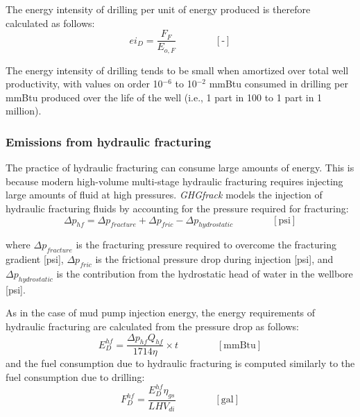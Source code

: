 \documentclass[11pt]{report}
\newcommand{\eqnunit}[1]{\quad\quad \scriptstyle{\left[\text{#1}\right]}}
\begin{document}
The energy intensity of drilling per unit of energy produced is therefore calculated as follows:
\begin{equation}
ei_{D} = \frac{F_{F}}{E_{o,F}} \quad\quad\eqnunit{-}
\end{equation}

The energy intensity of drilling tends to be small when amortized over total well productivity, with values on order 10$^{-6}$ to 10$^{-2}$ mmBtu consumed in drilling per mmBtu produced over the life of the well (i.e., 1 part in 100 to 1 part in 1 million).

\subsubsection{Emissions from hydraulic fracturing}

The practice of hydraulic fracturing can consume large amounts of energy. This is because modern high-volume multi-stage hydraulic fracturing requires injecting large amounts of fluid at high pressures. \emph{GHGfrack} models the injection of hydraulic fracturing fluids by accounting for the pressure required for fracturing:
\begin{equation}
\Delta p_{hf} = \Delta p_{fracture} + \Delta p_{fric} - \Delta p_{hydrostatic}  \quad\quad\eqnunit{psi} 
\end{equation}

where $\Delta p_{fracture}$ is the fracturing pressure required to overcome the fracturing gradient [psi], $ \Delta p_{fric}$ is the frictional pressure drop during injection [psi], and $\Delta p_{hydrostatic}$ is the contribution from the hydrostatic head of water in the wellbore [psi].

As in the case of mud pump injection energy, the energy requirements of hydraulic fracturing are calculated from the pressure drop as follows:
\begin{equation}
E_{D}^{hf} = \frac{\Delta p_{hf} Q_{hf}}{1714 \eta} \times t \quad\quad\eqnunit{mmBtu} 
\end{equation}
and the fuel consumption due to hydraulic fracturing is computed similarly to the fuel consumption due to drilling:
\begin{equation}
F_{D}^{hf} = \frac{E_{D}^{hf} \eta_{gs}}{LHV_{di}} \quad\quad\eqnunit{gal}
\end{equation}
\end{document}

